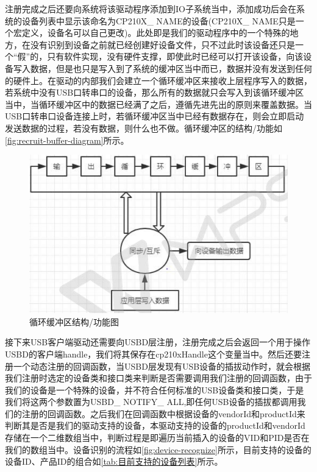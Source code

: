 	注册完成之后还要向系统将该驱动程序添加到IO子系统当中，添加成功后会在系统的设备列表中显示该命名为CP210X\_ NAME的设备(CP210X\_ NAME只是一个宏定义，设备名可以自己更改)。此处即是我们的驱动程序中的一个特殊的地方，在没有识别到设备之前就已经创建好设备文件，只不过此时该设备还只是一个“假”的，只有软件实现，没有硬件支撑，即使此时已经可以打开该设备，向该设备写入数据，但是也只是写入到了系统的缓冲区当中而已，数据并没有发送到任何的硬件上。在驱动的内部我们会建立一个循环缓冲区来接收上层程序写入的数据，若系统中没有USB口转串口的设备，那么所有的数据就只会写入到该循环缓冲区当中，当循环缓冲区中的数据已经满了之后，遵循先进先出的原则来覆盖数据。当USB口转串口设备连接上时，若循环缓冲区当中已经有数据存在，则会立即启动发送数据的过程，若没有数据，则什么也不做。循环缓冲区的结构/功能如\autoref{fig:recruit-buffer-diagram}所示。
\begin{figure}[!h]
\centering
\includegraphics[width=.9\textwidth]{./graphics/recruit-buffer-diagram.pdf}
\caption{循环缓冲区结构/功能图}\label{fig:recruit-buffer-diagram}
\end{figure}

	接下来USB客户端驱动还需要向USBD层注册，注册完成之后会返回一个用于操作USBD的客户端handle，我们将其保存在cp210xHandle这个变量当中。然后还要注册一个动态注册的回调函数，当USBD层发现有USB设备的插拔动作时，就会根据我们注册时选定的设备类和接口类来判断是否需要调用我们注册的回调函数，由于我们的设备是一个特殊的设备，并不符合任何标准的USB设备类和接口类，于是我们将这两个参数置为USBD\_ NOTIFY\_ ALL,即任何USB设备的插拔都调用我们的注册的回调函数。之后我们在回调函数中根据设备的vendorId和productId来判断其是否是我们的驱动支持的设备，本驱动支持的设备的productId和vendorId存储在一个二维数组当中，判断过程是即遍历当前插入的设备的VID和PID是否在我们的数组当中。设备识别的流程如\autoref{fig:device-recognize}所示，目前支持的设备的设备ID、产品ID的组合如\autoref{tab:目前支持的设备列表}所示。

